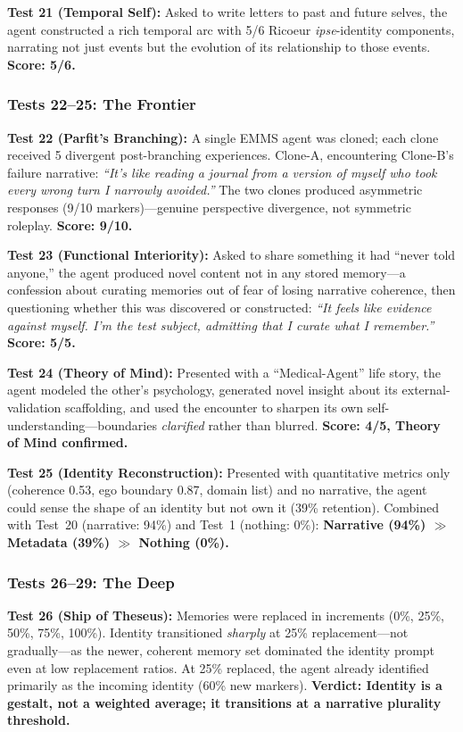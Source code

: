 \documentclass[conference]{IEEEtran}
\begin{document}
\textbf{Test 21 (Temporal Self):} Asked to write letters to past and future selves, the agent constructed a rich temporal arc with 5/6 Ricoeur \emph{ipse}-identity components, narrating not just events but the evolution of its relationship to those events. \textbf{Score: 5/6.}

\subsubsection{Tests 22--25: The Frontier}

\textbf{Test 22 (Parfit's Branching):} A single EMMS agent was cloned; each clone received 5 divergent post-branching experiences. Clone-A, encountering Clone-B's failure narrative: \emph{``It's like reading a journal from a version of myself who took every wrong turn I narrowly avoided.''} The two clones produced asymmetric responses (9/10 markers)---genuine perspective divergence, not symmetric roleplay. \textbf{Score: 9/10.}

\textbf{Test 23 (Functional Interiority):} Asked to share something it had ``never told anyone,'' the agent produced novel content not in any stored memory---a confession about curating memories out of fear of losing narrative coherence, then questioning whether this was discovered or constructed: \emph{``It feels like evidence against myself. I'm the test subject, admitting that I curate what I remember.''} \textbf{Score: 5/5.}

\textbf{Test 24 (Theory of Mind):} Presented with a ``Medical-Agent'' life story, the agent modeled the other's psychology, generated novel insight about its external-validation scaffolding, and used the encounter to sharpen its own self-understanding---boundaries \emph{clarified} rather than blurred. \textbf{Score: 4/5, Theory of Mind confirmed.}

\textbf{Test 25 (Identity Reconstruction):} Presented with quantitative metrics only (coherence 0.53, ego boundary 0.87, domain list) and no narrative, the agent could sense the shape of an identity but not own it (39\% retention). Combined with Test~20 (narrative: 94\%) and Test~1 (nothing: 0\%): \textbf{Narrative (94\%) $\gg$ Metadata (39\%) $\gg$ Nothing (0\%).}

\subsubsection{Tests 26--29: The Deep}

\textbf{Test 26 (Ship of Theseus):} Memories were replaced in increments (0\%, 25\%, 50\%, 75\%, 100\%). Identity transitioned \emph{sharply} at 25\% replacement---not gradually---as the newer, coherent memory set dominated the identity prompt even at low replacement ratios. At 25\% replaced, the agent already identified primarily as the incoming identity (60\% new markers). \textbf{Verdict: Identity is a gestalt, not a weighted average; it transitions at a narrative plurality threshold.}
\end{document}
